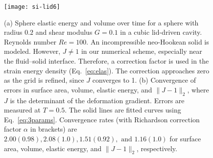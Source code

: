 \documentclass[times, 10pt]{article}
\newcommand{\Rey}{\textit{Re}}
\begin{document}
            \begin{figure}
            \centering
                \texttt{[image: si-lid6]}
                \caption{ (a) Sphere elastic energy and volume over time for a sphere with radius $0.2$ and shear modulus $G=0.1$ in a cubic lid-driven cavity.
                Reynolds number $\Rey=100$.
                 An incompressible neo-Hookean solid is modeled.
                 However,  $J \ne 1$ in our numerical scheme, especially near the fluid--solid interface.
                 Therefore, a correction factor is used in the strain energy density (Eq.~\eqref{eq:elas}).
                 The correction approaches zero as the grid is refined, since $J$ converges to 1.
                (b) Convergence of errors in surface area, volume, elastic energy, and $\|J-1\|_2$, where $J$ is the determinant of the deformation gradient.
                Errors are measured at $T=0.5$.
                The solid lines are fitted curves using Eq.~\eqref{eq:3params}.
                Convergence rates (with Richardson correction factor $\alpha$ in brackets) are $2.00 (0.98), 2.08 (1.0), 1.51 (0.92), \text{~and~} 1.16 (1.0)$ for surface area, volume, elastic energy, and $\|J-1\|_2$, respectively.
                }
                \label{fig:object_conv}
            \end{figure}
\end{document}
